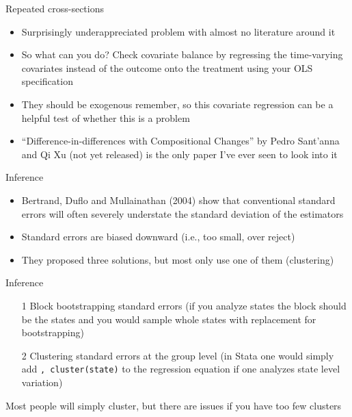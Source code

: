 \documentclass{beamer}
\begin{document}
\begin{frame}{Repeated cross-sections}

\begin{itemize}
\item Surprisingly underappreciated problem with almost no literature around it
\item So what can you do?  Check covariate balance by regressing the time-varying covariates instead of the outcome onto the treatment using your OLS specification
\item They should be exogenous remember, so this covariate regression can be a helpful test of whether this is a problem
\item ``Difference-in-differences with Compositional Changes'' by Pedro Sant'anna and Qi Xu (not yet released) is the only paper I've ever seen to look into it
\end{itemize}

\end{frame}


\begin{frame}{Inference}
	
	\begin{itemize}
	\item  Bertrand, Duflo and Mullainathan (2004) show that conventional standard errors will often severely understate the standard deviation of the estimators
	\item Standard errors are biased downward (i.e., too small, over reject)
	\item They proposed three solutions, but most only use one of them (clustering)
	\end{itemize}
\end{frame}


\begin{frame}{Inference}
	
		\begin{enumerate}
		\item[1 ] Block bootstrapping standard errors (if you analyze states the block should be the states and you would sample whole states with replacement for bootstrapping)
		\item[2 ] Clustering standard errors at the group level (in Stata one would simply add \texttt{, cluster(state)} to the regression equation if one analyzes state level variation)
		\end{enumerate}

\bigskip

Most people will simply cluster, but there are issues if you have too few clusters
		
\end{frame}
\end{document}

